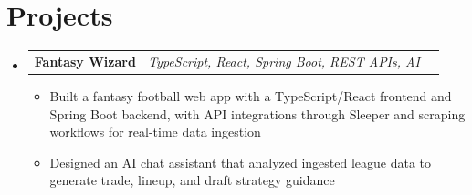 \documentclass[letterpaper,11pt]{article}
\makeatletter
\newcommand{\resumeItem}[1]{
  \item\small{
    {#1 \vspace{-1pt}}
  }
}
\newcommand{\resumeProjectHeading}[2]{
    \item
    \begin{tabular*}{0.97\textwidth}{l@{\extracolsep{\fill}}r}
      \small#1 & #2 \\
    \end{tabular*}\vspace{-7pt}
}
\newcommand{\resumeSubHeadingListStart}{\begin{itemize}[leftmargin=0.15in, label={}]}
\newcommand{\resumeSubHeadingListEnd}{\end{itemize}}
\newcommand{\resumeItemListStart}{\begin{itemize}[leftmargin=0.18in,itemsep=1pt,topsep=2pt]}
\newcommand{\resumeItemListEnd}{\end{itemize}\vspace{-5pt}}
\makeatother
\begin{document}
%
\section{Projects}
    \resumeSubHeadingListStart
      \resumeProjectHeading
          {\textbf{Fantasy Wizard} $|$ \emph{TypeScript, React, Spring Boot, REST APIs, AI}}{}
          \resumeItemListStart
            \resumeItem{Built a fantasy football web app with a TypeScript/React frontend and Spring Boot backend, with API integrations through Sleeper and scraping workflows for real-time data ingestion}
            \resumeItem{Designed an AI chat assistant that analyzed ingested league data to generate trade, lineup, and draft strategy guidance}
          \resumeItemListEnd
    \resumeSubHeadingListEnd

\end{document}
